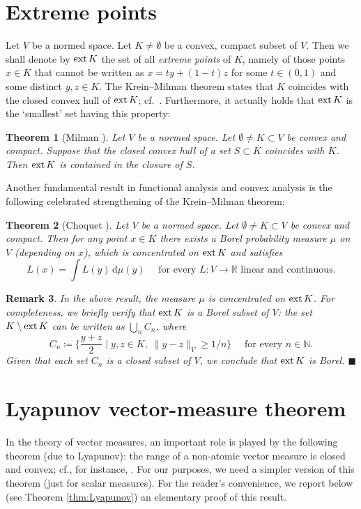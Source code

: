 \documentclass[reqno]{amsart}
\numberwithin{equation}{section}
\newcommand{\N}{\mathbb{N}}
\newcommand{\R}{\mathbb{R}}
\renewcommand{\d}{{\mathrm d}}
\newcommand{\1}{\mathbbm 1}
\newcommand{\fr}{\penalty-20\null\hfill\(\blacksquare\)}
\newtheorem{theorem}{Theorem}[section]
\newtheorem{remark}[theorem]{Remark}
\begin{document}
\section{Extreme points}\label{app:extreme_points}
%
%
Let \(V\) be a normed space. Let \(K\neq\emptyset\) be a convex, compact subset
of \(V\). Then we shall denote by \({\rm ext}\,K\) the set of all
\emph{extreme points} of \(K\), namely of those points \(x\in K\) that cannot
be written as \(x=ty+(1-t)z\) for some \(t\in(0,1)\) and some distinct \(y,z\in K\).
The Krein--Milman theorem states that \(K\) coincides with the closed convex hull
of \({\rm ext}\,K\); cf.\ \cite{KM40}. Furthermore, it actually holds that
\({\rm ext}\,K\) is the `smallest' set having this property:
%
%
\begin{theorem}[Milman \cite{Milman47}]\label{thm:Milman}
Let \(V\) be a normed space. Let \(\emptyset\neq K\subset V\) be convex and compact.
Suppose that the closed convex hull of a set \(S\subset K\) coincides with \(K\).
Then \({\rm ext}\,K\) is contained in the closure of \(S\).
\end{theorem}
%
%
Another fundamental result in functional analysis and convex analysis is the
following celebrated strengthening of the Krein--Milman theorem:
%
%
\begin{theorem}[Choquet \cite{Phelps03}]\label{thm:Choquet}
Let \(V\) be a normed space. Let \(\emptyset\neq K\subset V\) be convex and compact.
Then for any point \(x\in K\) there exists a Borel probability measure
\(\mu\) on \(V\) (depending on \(x\)), which is concentrated on \({\rm ext}\,K\)
and satisfies
\[
L(x)=\int L(y)\,\d\mu(y)\quad\text{ for every }
L\colon V\to\R\text{ linear and continuous.}
\]
\end{theorem}
%
%
\begin{remark}{\rm
In the above result, the measure \(\mu\) is concentrated on \({\rm ext}\,K\).
For completeness, we briefly verify that \({\rm ext}\,K\) is a Borel subset
of \(V\): the set \(K\setminus{\rm ext}\,K\) can be written as \(\bigcup_n C_n\), where
\[
C_n\coloneqq\bigg\{\frac{y+z}{2}\;\bigg|\;y,z\in K,\;\|y-z\|_V\geq 1/n\bigg\}
\quad\text{ for every }n\in\N.
\]
Given that each set \(C_n\) is a closed subset of \(V\),
we conclude that \({\rm ext}\,K\) is Borel.
\fr}\end{remark}
%
%
%
%
\section{Lyapunov vector-measure theorem}\label{app:Lyapunov}
%
%
In the theory of vector measures, an important role is played by the following theorem
(due to Lyapunov): the range of a non-atomic vector measure is closed and convex;
cf., for instance, \cite{DU77}. For our purposes, we need a simpler version of this
theorem (just for scalar measures). For the reader's convenience, we report below
(see Theorem \ref{thm:Lyapunov}) an elementary proof of this result.
\medskip
\end{document}
